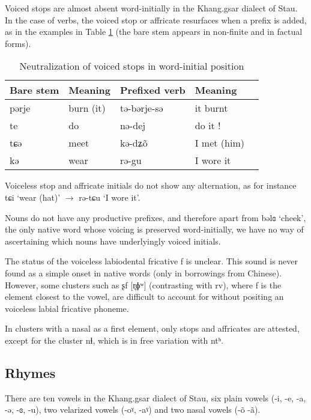 \documentclass[oneside,a4paper,11pt]{article}
\newcommand{\ipa}[1]{{\phon#1}} %
\begin{document}
Voiced stops are almost absent word-initially in the Khang.gsar dialect of Stau. In the case of verbs, the voiced stop or affricate resurfaces when a prefix is added, as in the examples in Table \ref{tab:voiced} (the bare stem appears in non-finite and in factual forms).

 \begin{table}[H]
 \caption{Neutralization of voiced stops in word-initial position} \label{tab:voiced} \centering 
\begin{tabular}{lllll}
\toprule
Bare stem & Meaning & Prefixed verb & Meaning \\
\midrule
\ipa{pərje} & burn (it) &\ipa{tə-bərje-sə} & it burnt \\
\ipa{te} & do &\ipa{nə-dej} & do it !\\
\ipa{tɕə} & meet &\ipa{kə-dʑõ} & I met (him)\\
\ipa{kə} &wear &\ipa{rə-gu} & I wore it \\
\bottomrule
\end{tabular}
\end{table}
Voiceless stop and affricate initials do not show any alternation, as for instance \ipa{tɕi} `wear (hat)' $\rightarrow$ \ipa{rə-tɕu} `I wore it'.

Nouns do not have any productive prefixes, and therefore apart from \ipa{bəlɞ} `cheek', the only native word whose voicing is preserved word-initially, we have no way of ascertaining which nouns have underlyingly voiced initials.

 
The status of the voiceless labiodental fricative \ipa{f} is unclear. This sound is never found as a simple onset in native words (only in borrowings from Chinese). However, some clusters such as  \ipa{ʂf} [\ipa{r̥ɸʷ}] (contrasting with \ipa{rv}), where \ipa{f} is the element closest to the vowel, are difficult to account for without positing an voiceless labial fricative phoneme.
 
 In clusters with a nasal as a first element, only stops and affricates are attested, except for the cluster \ipa{nɬ}, which is in free variation with \ipa{ntʰ}.
 
  \subsection{Rhymes}
 
There are ten vowels in the Khang.gsar dialect of Stau, six plain vowels (-\ipa{i}, -\ipa{e}, -\ipa{a}, -\ipa{ə}, -\ipa{ɞ},  -\ipa{u}), two velarized vowels (-\ipa{oˠ}, -\ipa{aˠ}) and two nasal vowels (-\ipa{õ}   -\ipa{ã}).
\end{document}

